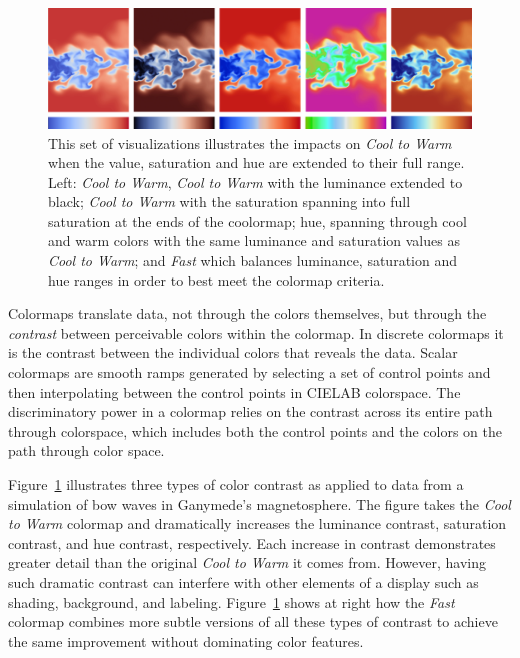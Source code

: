 \documentclass{IEEEcsmag}
\newcommand*{\colormap}[1]{\textsl{#1}\xspace}
\newcommand*{\coolwarm}{\colormap{Cool to Warm}}
\newcommand*{\fast}{\colormap{Fast}}
\begin{document}
\begin{figure}[t]
\centering
\includegraphics[width=\textwidth]{Final_Pics/HSVV.png}
\caption{This set of visualizations illustrates the impacts on \coolwarm when the value, saturation and hue are extended to their full range. Left: \coolwarm, \coolwarm with the luminance extended to black; \coolwarm with the saturation spanning into full saturation at the ends of the coolormap; hue, spanning through cool and warm colors with the same luminance and saturation values as \coolwarm; and \fast which balances luminance, saturation and hue ranges in order to best meet the colormap criteria.}

\label{contrast}
\end{figure}

Colormaps translate data, not through the colors themselves, but through the \textit{contrast} between perceivable colors within the colormap. In discrete colormaps it is the contrast between the individual colors that reveals the data. Scalar colormaps are smooth ramps generated by selecting a set of control points and then interpolating between the control points in CIELAB colorspace. The discriminatory power in a colormap relies on the contrast across its entire path through colorspace, which includes both the control points and the colors on the path through color space.

Figure~\ref{contrast} illustrates three types of color contrast as applied to data from a simulation of bow waves in Ganymede's magnetosphere.
The figure takes the \coolwarm colormap and dramatically increases the luminance contrast, saturation contrast, and hue contrast, respectively.
Each increase in contrast demonstrates greater detail than the original \coolwarm it comes from.
However, having such dramatic contrast can interfere with other elements of a display such as shading, background, and labeling.
Figure~\ref{contrast} shows at right how the \fast colormap combines more subtle versions of all these types of contrast to achieve the same improvement without dominating color features.
\end{document}
